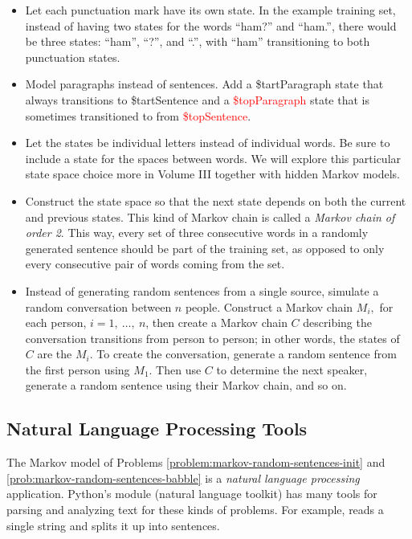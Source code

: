 \begin{itemize}
\item Let each punctuation mark have its own state.
In the example training set, instead of having two states for the words ``ham?'' and ``ham.'', there would be three states: ``ham'', ``?'', and ``.'', with ``ham'' transitioning to both punctuation states.

\item Model paragraphs instead of sentences.
Add a \textcolor[rgb]{0,.6,0}{\$tartParagraph} state that always transitions to \textcolor[rgb]{0,.6,0}{\$tartSentence} and a \textcolor{red}{\$topParagraph} state that is sometimes transitioned to from \textcolor{red}{\$topSentence}.

\item Let the states be individual letters instead of individual words.
Be sure to include a state for the spaces between words.
We will explore this particular state space choice more in Volume III together with hidden Markov models.

\item Construct the state space so that the next state depends on both the current and previous states.
This kind of Markov chain is called a \emph{Markov chain of order 2}.
This way, every set of three consecutive words in a randomly generated sentence should be part of the training set, as opposed to only every consecutive pair of words coming from the set.

\item Instead of generating random sentences from a single source, simulate a random conversation between $n$ people.
Construct a Markov chain $M_i,$ for each person, $i=1,\ \ldots,\ n$, then create a Markov chain $C$ describing the conversation transitions from person to person; in other words, the states of $C$ are the $M_i$.
To create the conversation, generate a random sentence from the first person using $M_1$.
Then use $C$ to determine the next speaker, generate a random sentence using their Markov chain, and so on.
\end{itemize}

\subsection*{Natural Language Processing Tools} %

The Markov model of Problems \ref{problem:markov-random-sentences-init} and \ref{prob:markov-random-sentences-babble} is a \emph{natural language processing} application.
Python's  module (natural language toolkit) has many tools for parsing and analyzing text for these kinds of problems.
For example,  reads a single string and splits it up into sentences.


